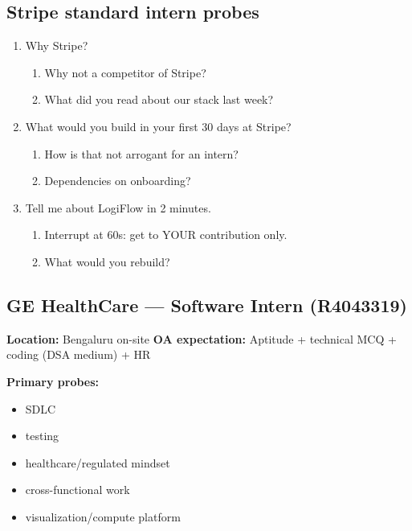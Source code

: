 \documentclass[9pt,a4paper]{article}
\begin{document}
\subsection{Stripe standard intern probes}
\begin{enumerate}[label=\textbf{Q\arabic*:}, leftmargin=*]
  \item Why Stripe?
  \begin{enumerate}[label=\textit{FU\arabic*:}, leftmargin=2em]
    \item Why not a competitor of Stripe?
    \item What did you read about our stack last week?
  \end{enumerate}
  \item What would you build in your first 30 days at Stripe?
  \begin{enumerate}[label=\textit{FU\arabic*:}, leftmargin=2em]
    \item How is that not arrogant for an intern?
    \item Dependencies on onboarding?
  \end{enumerate}
  \item Tell me about LogiFlow in 2 minutes.
  \begin{enumerate}[label=\textit{FU\arabic*:}, leftmargin=2em]
    \item Interrupt at 60s: get to YOUR contribution only.
    \item What would you rebuild?
  \end{enumerate}
\end{enumerate}
\newpage
\subsection{GE HealthCare --- Software Intern (R4043319)}
\textbf{Location:} Bengaluru on-site \quad \textbf{OA expectation:} Aptitude + technical MCQ + coding (DSA medium) + HR

\textbf{Primary probes:}
\begin{itemize}
  \item SDLC
  \item testing
  \item healthcare/regulated mindset
  \item cross-functional work
  \item visualization/compute platform
\end{itemize}
\end{document}
